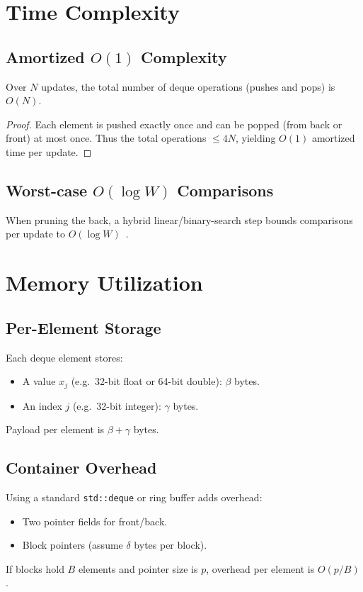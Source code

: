 \documentclass[12pt,letterpaper]{article}
\begin{document}
\section{Time Complexity}
\subsection{Amortized \(O(1)\) Complexity}
\begin{theorem}
Over \(N\) updates, the total number of deque operations (pushes and pops) is \(O(N)\).
\end{theorem}
\begin{proof}
Each element is pushed exactly once and can be popped (from back or front) at most once. Thus the total operations \(\le4N\), yielding \(O(1)\) amortized time per update.
\end{proof}

\subsection{Worst-case \(O(\log W)\) Comparisons}
When pruning the back, a hybrid linear/binary-search step bounds comparisons per update to \(O(\log W)\)~\cite{Lemire2006}.

\section{Memory Utilization}
\subsection{Per-Element Storage}
Each deque element stores:
\begin{itemize}
  \item A value \(x_j\) (e.g.\ 32-bit float or 64-bit double): \(\beta\) bytes.
  \item An index \(j\) (e.g.\ 32-bit integer): \(\gamma\) bytes.
\end{itemize}
Payload per element is \(\beta+\gamma\) bytes.

\subsection{Container Overhead}
Using a standard \texttt{std::deque} or ring buffer adds overhead:
\begin{itemize}
  \item Two pointer fields for front/back.
  \item Block pointers (assume \(\delta\) bytes per block).
\end{itemize}
If blocks hold \(B\) elements and pointer size is \(p\), overhead per element is \(O(p/B)\).
\end{document}
